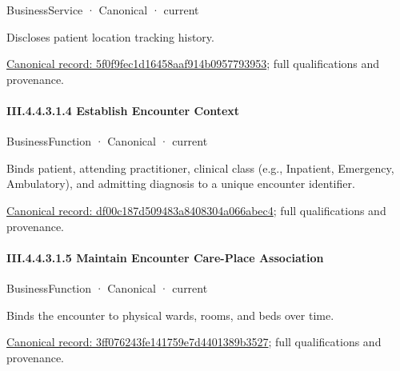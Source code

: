 \label{element:5f0f9fec1d16458aaf914b0957793953}
{\small BusinessService · Canonical · current}\par

Discloses patient location tracking history.


{\footnotesize \href{../../../../../../../../continuum/business/business-service/5f0f9fec1d16458aaf914b0957793953.md}{Canonical record: 5f0f9fec1d16458aaf914b0957793953}; full qualifications and provenance.}\par
\paragraph*{III.4.4.3.1.4 Establish Encounter Context}
\label{navigation:III.4.4.3.1.4}

\label{element:df00c187d509483a8408304a066abec4}
{\small BusinessFunction · Canonical · current}\par

Binds patient, attending practitioner, clinical class (e.g., Inpatient, Emergency, Ambulatory), and admitting diagnosis to a unique encounter identifier.


{\footnotesize \href{../../../../../../../../continuum/business/business-function/df00c187d509483a8408304a066abec4.md}{Canonical record: df00c187d509483a8408304a066abec4}; full qualifications and provenance.}\par
\paragraph*{III.4.4.3.1.5 Maintain Encounter Care-Place Association}
\label{navigation:III.4.4.3.1.5}

\label{element:3ff076243fe141759e7d4401389b3527}
{\small BusinessFunction · Canonical · current}\par

Binds the encounter to physical wards, rooms, and beds over time.


{\footnotesize \href{../../../../../../../../continuum/business/business-function/3ff076243fe141759e7d4401389b3527.md}{Canonical record: 3ff076243fe141759e7d4401389b3527}; full qualifications and provenance.}\par
